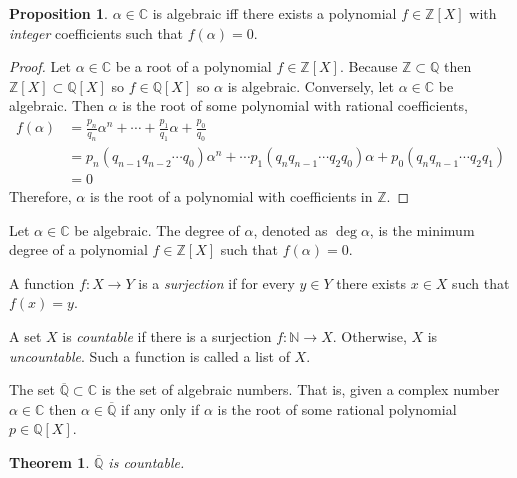 \documentclass{article}
\newcommand{\Z}{\mathbb{Z}}
\newcommand{\N}{\mathbb{N}}
\newcommand{\C}{\mathbb{C}}
\newcommand{\Q}{\mathbb{Q}}
\newenvironment{definition}[1][Definition:]{\begin{trivlist}
\item[\hskip \labelsep {\bfseries #1}]}{\end{trivlist}}
\theoremstyle{theorem}
\newtheorem{theorem}{Theorem}[section]
\theoremstyle{definition}
\theoremstyle{definition}
\newtheorem*{proposition}{Proposition}
\theoremstyle{remark}
\theoremstyle{definition}
\theoremstyle{remark}
\begin{document}
\begin{proposition}
$\alpha \in \C$ is algebraic iff there exists a polynomial $f \in \Z[X]$ with \textit{integer} coefficients such that $f(\alpha) = 0$. 
\end{proposition}

\begin{proof}
Let $\alpha \in \C$ be a root of a polynomial $f \in \Z[X]$. Because $\Z \subset \Q$ then $\Z[X] \subset \Q[X]$ so $f \in \Q[X]$ so $\alpha$ is algebraic. Conversely, let $\alpha \in \C$ be algebraic. Then $\alpha$ is the root of some polynomial with rational coefficients, 
\begin{align*}
f(\alpha) &= \frac{p_n}{q_n} \alpha^n + \cdots + \frac{p_1}{q_1} \alpha + \frac{p_0}{q_0} \\ & = p_n (q_{n-1} q_{n-2} \cdots q_0) \alpha^n + \cdots p_1 (q_n q_{n-1} \cdots q_{2} q_0) \alpha + p_0 (q_{n} q_{n-1} \cdots q_2 q_1) \\ & = 0 
\end{align*}
Therefore, $\alpha$ is the root of a polynomial with coefficients in $\Z$. 
\end{proof}

\begin{definition}
Let $\alpha \in \C$ be algebraic. The degree of $\alpha$, denoted as $\deg{\alpha}$, is the minimum degree of a polynomial $f \in \Z[X]$ such that $f(\alpha) = 0$.  
\end{definition}

\begin{definition}
A function $f : X \to Y$ is a \textit{surjection} if for every $y \in Y$ there exists $x \in X$ such that $f(x) = y$. 
\end{definition}

\begin{definition}
A set $X$ is \textit{countable} if there is a surjection $f : \N \to X$. Otherwise, $X$ is \textit{uncountable}. Such a function is called a list of $X$. 
\end{definition}

\begin{definition}
The set $\overline{\Q} \subset \C$ is the set of algebraic numbers. That is, given a complex number $\alpha \in \C$ then $\alpha \in \overline{\Q}$ if any only if $\alpha$ is the root of some rational polynomial $p \in \Q[X]$. 
\end{definition}

\begin{theorem}
$\overline{\Q}$ is countable.
\end{theorem}
\end{document}
